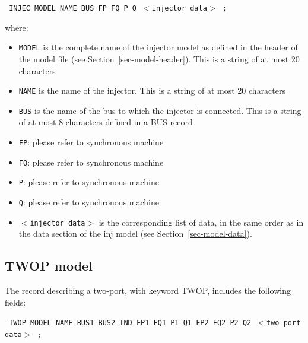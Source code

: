 {\tt \hspace*{5ex} INJEC  MODEL  NAME  BUS  FP  FQ  P  Q $<$injector data$>$ ;}

where:
\begin{itemize}
\item{\tt MODEL} is the complete name of the injector model as defined in the header of the model file (see Section~\ref{sec-model-header}). This is a string of at most 20 characters
\item{\tt NAME} is the name of the injector.  This is a string of at most 20 characters
\item{\tt BUS} is the name of the bus to which the injector is connected. This is a string of at most 8 characters defined in a BUS record
\item{\tt FP}: please refer to synchronous machine
\item{\tt FQ}: please refer to synchronous machine
\item{\tt P}: please refer to synchronous machine
\item{\tt Q}: please refer to synchronous machine
\item{\tt $<$injector data$>$} is the corresponding list of data, in the same order as in the data section of the inj model (see Section~\ref{sec-model-data}).
\end{itemize}

\subsection{TWOP model}

The record describing a two-port, with keyword TWOP, includes the following fields:

{\tt \hspace*{1ex} TWOP  MODEL  NAME  BUS1  BUS2  IND  FP1  FQ1  P1  Q1  FP2  FQ2  P2  Q2 $<$two-port data$>$ ;}

